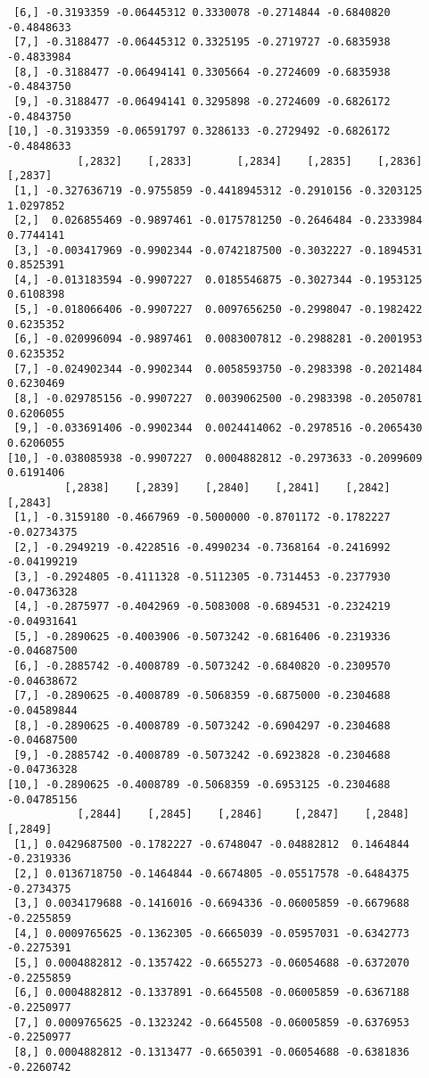 \documentclass[
  letterpaper,
  DIV=11,
  numbers=noendperiod]{scrreprt}
\begin{document}
\begin{verbatim}
 [6,] -0.3193359 -0.06445312 0.3330078 -0.2714844 -0.6840820 -0.4848633
 [7,] -0.3188477 -0.06445312 0.3325195 -0.2719727 -0.6835938 -0.4833984
 [8,] -0.3188477 -0.06494141 0.3305664 -0.2724609 -0.6835938 -0.4843750
 [9,] -0.3188477 -0.06494141 0.3295898 -0.2724609 -0.6826172 -0.4843750
[10,] -0.3193359 -0.06591797 0.3286133 -0.2729492 -0.6826172 -0.4848633
           [,2832]    [,2833]       [,2834]    [,2835]    [,2836]   [,2837]
 [1,] -0.327636719 -0.9755859 -0.4418945312 -0.2910156 -0.3203125 1.0297852
 [2,]  0.026855469 -0.9897461 -0.0175781250 -0.2646484 -0.2333984 0.7744141
 [3,] -0.003417969 -0.9902344 -0.0742187500 -0.3032227 -0.1894531 0.8525391
 [4,] -0.013183594 -0.9907227  0.0185546875 -0.3027344 -0.1953125 0.6108398
 [5,] -0.018066406 -0.9907227  0.0097656250 -0.2998047 -0.1982422 0.6235352
 [6,] -0.020996094 -0.9897461  0.0083007812 -0.2988281 -0.2001953 0.6235352
 [7,] -0.024902344 -0.9902344  0.0058593750 -0.2983398 -0.2021484 0.6230469
 [8,] -0.029785156 -0.9907227  0.0039062500 -0.2983398 -0.2050781 0.6206055
 [9,] -0.033691406 -0.9902344  0.0024414062 -0.2978516 -0.2065430 0.6206055
[10,] -0.038085938 -0.9907227  0.0004882812 -0.2973633 -0.2099609 0.6191406
         [,2838]    [,2839]    [,2840]    [,2841]    [,2842]     [,2843]
 [1,] -0.3159180 -0.4667969 -0.5000000 -0.8701172 -0.1782227 -0.02734375
 [2,] -0.2949219 -0.4228516 -0.4990234 -0.7368164 -0.2416992 -0.04199219
 [3,] -0.2924805 -0.4111328 -0.5112305 -0.7314453 -0.2377930 -0.04736328
 [4,] -0.2875977 -0.4042969 -0.5083008 -0.6894531 -0.2324219 -0.04931641
 [5,] -0.2890625 -0.4003906 -0.5073242 -0.6816406 -0.2319336 -0.04687500
 [6,] -0.2885742 -0.4008789 -0.5073242 -0.6840820 -0.2309570 -0.04638672
 [7,] -0.2890625 -0.4008789 -0.5068359 -0.6875000 -0.2304688 -0.04589844
 [8,] -0.2890625 -0.4008789 -0.5073242 -0.6904297 -0.2304688 -0.04687500
 [9,] -0.2885742 -0.4008789 -0.5073242 -0.6923828 -0.2304688 -0.04736328
[10,] -0.2890625 -0.4008789 -0.5068359 -0.6953125 -0.2304688 -0.04785156
           [,2844]    [,2845]    [,2846]     [,2847]    [,2848]    [,2849]
 [1,] 0.0429687500 -0.1782227 -0.6748047 -0.04882812  0.1464844 -0.2319336
 [2,] 0.0136718750 -0.1464844 -0.6674805 -0.05517578 -0.6484375 -0.2734375
 [3,] 0.0034179688 -0.1416016 -0.6694336 -0.06005859 -0.6679688 -0.2255859
 [4,] 0.0009765625 -0.1362305 -0.6665039 -0.05957031 -0.6342773 -0.2275391
 [5,] 0.0004882812 -0.1357422 -0.6655273 -0.06054688 -0.6372070 -0.2255859
 [6,] 0.0004882812 -0.1337891 -0.6645508 -0.06005859 -0.6367188 -0.2250977
 [7,] 0.0009765625 -0.1323242 -0.6645508 -0.06005859 -0.6376953 -0.2250977
 [8,] 0.0004882812 -0.1313477 -0.6650391 -0.06054688 -0.6381836 -0.2260742

\end{verbatim}
\end{document}
